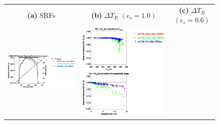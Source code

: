 \begin{figure}[H]
  \centering
  \begin{tabular}{c c c}
    \textsf{\textbf{(a)} SRFs} &
    \textsf{\textbf{(b)} $\Delta T_B$ $(\epsilon_s = 1.0)$} &
    \textsf{\textbf{(c)} $\Delta T_B$ $(\epsilon_s = 0.6)$} \\
    \includegraphics[bb=80 400 280 558,clip,scale=0.85]{graphics/srf/Vset/atms_npp.ch1.osrf.eps} &
    \includegraphics[bb=85 400 260 558,clip,scale=0.85]{graphics/dtb/Vset/e1.0_r0.0/atms_npp.ch1.dTb.eps} & 

\end{tabular}
\end{figure}
